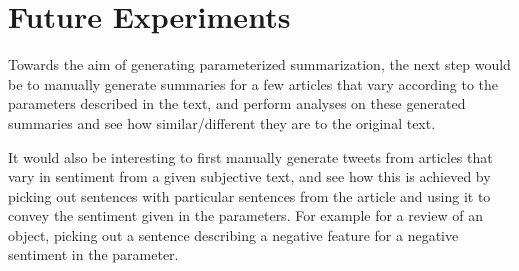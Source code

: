 \chapter {Future Experiments}

Towards the aim of generating parameterized summarization, the next step would be to manually generate summaries for a few articles that vary according to the parameters described in the text, and perform analyses on these generated summaries and see how similar/different they are to the original text.

It would also be interesting to first manually generate tweets from articles that vary in sentiment from a given subjective text, and see how this is achieved by picking out sentences with particular sentences from the article and using it to convey the sentiment given in the parameters. For example for a review of an object, picking out a sentence describing a negative feature for a negative sentiment in the parameter.